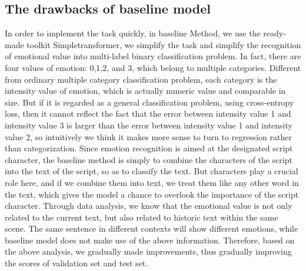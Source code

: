 \documentclass[12pt,twocolumn,letterpaper]{article}
\begin{document}
\subsection{The drawbacks of baseline model}
In order to implement the task quickly, in baseline Method, we use the ready-made toolkit Simpletransformer, we simplify the task and simplify the recognition of emotional value into multi-label binary classification problem. In fact, there are four values of emotion: 0,1,2, and 3, which belong to multiple categories. 
Different from ordinary multiple category classification problem, each category is the intensity value of emotion, which is actually numeric value and comparable in size. But if it is regarded as a general classification problem, using cross-entropy loss, then it cannot reflect the fact that the error between intensity value 1 and intensity value 3 is larger than the error between intensity value 1 and intensity value 2, so intuitively we think it makes more sense to turn to regression rather than categorization.  
Since emotion recognition is aimed at the designated script character, the baseline method is simply to combine the characters of the script into the text of the script, so as to classify the text. But characters play a crucial role here, and if we combine them into text, we treat them like any other word in the text, which gives the model a chance to overlook the importance of the script character.  
Through data analysis, we know that the emotional value is not only related to the current text, but also related to historic text within the same scene. The same sentence in different contexts will show different emotions, while baseline model does not make use of the above information.  
Therefore, based on the above analysis, we gradually made improvements, thus gradually improving the scores of validation set and test set.    
\end{document}
